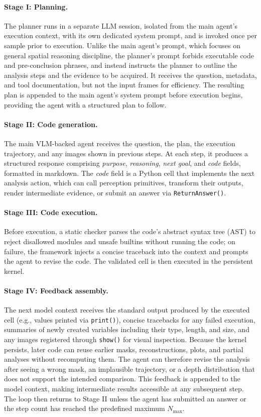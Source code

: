 \documentclass{llmxive}
\providecommand{\paragrapht}{\paragraph}
\begin{document}
\paragrapht{Stage I: Planning.}
The planner runs in a separate LLM session, isolated from the main agent's execution context, with its own dedicated system prompt, and is invoked once per sample prior to execution.
Unlike the main agent's prompt, which focuses on general spatial reasoning discipline, the planner's prompt forbids executable code and pre-conclusion phrases, and instead instructs the planner to outline the analysis steps and the evidence to be acquired.
It receives the question, metadata, and tool documentation, but not the input frames for efficiency.
The resulting plan is appended to the main agent's system prompt before execution begins, providing the agent with a structured plan to follow.


\paragrapht{Stage II: Code generation.}
The main VLM-backed agent receives the question, the plan, the execution trajectory, and any images shown in previous steps.
At each step, it produces a structured response comprising \textit{purpose}, \textit{reasoning}, \textit{next goal}, and \textit{code} fields, formatted in markdown.
The \textit{code} field is a Python cell that implements the next analysis action, which can call perception primitives, transform their outputs, render intermediate evidence, or submit an answer via \texttt{ReturnAnswer()}.

\paragrapht{Stage III: Code execution.}
Before execution, a static checker parses the code's abstract syntax tree (AST) to reject disallowed modules and unsafe builtins without running the code; on failure, the framework injects a concise traceback into the context and prompts the agent to revise the code.
The validated cell is then executed in the persistent kernel.

\paragrapht{Stage IV: Feedback assembly.}
The next model context receives the standard output produced by the executed cell (e.g., values printed via \texttt{print()}), concise tracebacks for any failed execution, summaries of newly created variables including their type, length, and size, and any images registered through \texttt{show()} for visual inspection.
Because the kernel persists, later code can reuse earlier masks, reconstructions, plots, and partial analyses without recomputing them.
The agent can therefore revise the analysis after seeing a wrong mask, an implausible trajectory, or a depth distribution that does not support the intended comparison. 
This feedback is appended to the model context, making intermediate results accessible at any subsequent step.
The loop then returns to Stage II unless the agent has submitted an answer or the step count has reached the predefined maximum $N_{\text{max}}$.
\end{document}
